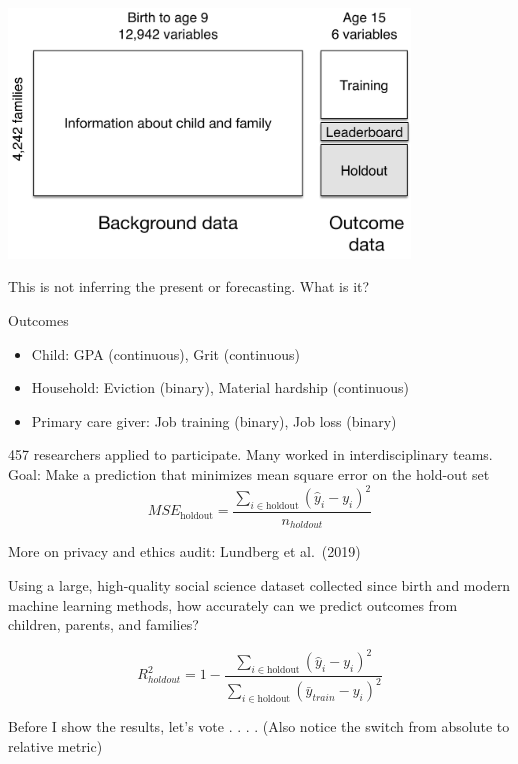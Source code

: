 \documentclass[aspectratio=169]{beamer}
\begin{document}
\begin{frame}

\begin{center}
\includegraphics[width=0.8\textwidth]{figures/ffc_design_matrix_ml}
\end{center}

\vfill
This is not inferring the present or forecasting. What is it?

\end{frame}
\begin{frame}

Outcomes
\begin{itemize}
\item Child: GPA (continuous), Grit (continuous)
\item Household:  Eviction (binary), Material hardship (continuous)
\item Primary care giver: Job training (binary), Job loss (binary)
\end{itemize}

\end{frame}
\begin{frame}

457 researchers applied to participate. Many worked in interdisciplinary teams. Goal: Make a prediction that minimizes mean square error on the hold-out set
\begin{equation*}
MSE_{\text{holdout}} = \frac{\sum_{i \in \text{holdout}} (\hat{y}_i - y_i)^2}{n_{holdout}}
\end{equation*}

\vfill
More on privacy and ethics audit: Lundberg et al.\ (2019)
\end{frame}
\begin{frame}

Using a large, high-quality social science dataset collected since birth and modern machine learning methods, how accurately can we predict outcomes from children, parents, and families?

\begin{equation*}
R^2_{holdout} = 1 - \frac{\sum_{i \in \text{holdout}} (\hat{y}_i - y_i)^2}{\sum_{i \in \text{holdout}} (\bar{y}_{train} - y_i)^2}
\end{equation*}

\pause 
\vfill

Before I show the results, let's vote . . . . (Also notice the switch from absolute to relative metric)

\end{frame}
\end{document}
